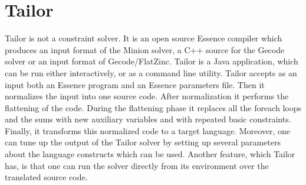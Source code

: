 \section{Tailor}
\label{tailor}

Tailor is not a constraint solver. It is an open source Essence compiler which produces an input
format of the Minion solver, a C++ source for the Gecode solver or an input format of Gecode/FlatZinc.
Tailor is a Java application, which can be run either interactively, or as a
command line utility. Tailor accepts as an input both an Essence program and an Essence parameters file.
Then it normalizes the input into one source code. After normalization it performs the 
flattening of the code. During the flattening phase it replaces all the foreach loops and the sums
with new auxiliary variables and with repeated basic constraints. Finally, it transforms this normalized 
code to a target language. Moreover, one can tune up the output of the Tailor solver by setting up several 
parameters about the language constructs which can be used. Another feature, which Tailor has, is that one 
can run the solver directly from its environment over the translated source code.